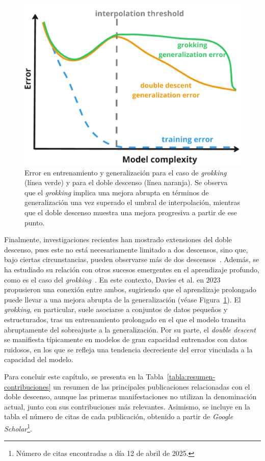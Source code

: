 \begin{figure}[h]
    \centering
    \includegraphics[width=0.6\linewidth]{img/grokking.png}
    \caption[\textit{Grokking} y \textit{Deep Double Descent}.]{Error en entrenamiento y generalización para el caso de \textit{grokking} (línea verde) y para el doble descenso (línea naranja). Se observa que el \textit{grokking} implica una mejora abrupta en términos de generalización una vez superado el umbral de interpolación, mientras que el doble descenso muestra una mejora progresiva a partir de ese punto.}\label{fig:grokking}
\end{figure}

Finalmente, investigaciones recientes han mostrado extensiones del doble descenso, pues este no está necesariamente limitado a dos descensos, sino que, bajo ciertas circunstancias, pueden observarse más de dos descensos~\cite{d_Ascoli2021, Chen2021}. Además, se ha estudiado su relación con otros sucesos emergentes en el aprendizaje profundo, como es el caso del \emph{grokking}~\cite{Power2022}. En este contexto, Davies et al. en $2023$~\cite{Davies2023} propusieron una conexión entre ambos, sugiriendo que el aprendizaje prolongado puede llevar a una mejora abrupta de la generalización (véase Figura~\ref{fig:grokking}). El \textit{grokking}, en particular, suele asociarse a conjuntos de datos pequeños y estructurados, tras un entrenamiento prolongado en el que el modelo transita abruptamente del sobreajuste a la generalización. Por su parte, el \textit{double descent} se manifiesta típicamente en modelos de gran capacidad entrenados con datos ruidosos, en los que se refleja una tendencia decreciente del error vinculada a la capacidad del modelo.\newline

Para concluir este capítulo, se presenta en la Tabla~\ref{tabla:resumen-contribuciones} un resumen de las principales publicaciones relacionadas con el doble descenso, aunque las primeras manifestaciones no utilizan la denominación actual, junto con sus contribuciones más relevantes. Asimismo, se incluye en la tabla el número de citas de cada publicación, obtenido a partir de \textit{Google Scholar}\footnote{Número de citas encontradas a día 12 de abril de 2025.}.\newline

